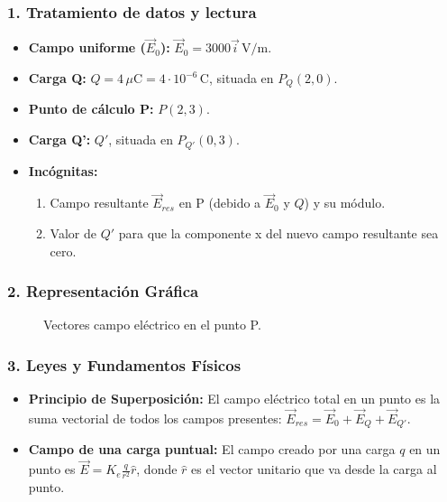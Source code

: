 \subsubsection*{1. Tratamiento de datos y lectura}
\begin{itemize}
    \item \textbf{Campo uniforme ($\vec{E}_0$):} $\vec{E}_0 = 3000\vec{i}\,\text{V/m}$.
    \item \textbf{Carga Q:} $Q = 4\,\mu\text{C} = 4\cdot 10^{-6}\,\text{C}$, situada en $P_Q(2,0)$.
    \item \textbf{Punto de cálculo P:} $P(2,3)$.
    \item \textbf{Carga Q':} $Q'$, situada en $P_{Q'}(0,3)$.
    \item \textbf{Incógnitas:}
    \begin{enumerate}
        \item Campo resultante $\vec{E}_{res}$ en P (debido a $\vec{E}_0$ y $Q$) y su módulo.
        \item Valor de $Q'$ para que la componente x del nuevo campo resultante sea cero.
    \end{enumerate}
\end{itemize}

\subsubsection*{2. Representación Gráfica}
\begin{figure}[H]
    \centering
    \caption{Vectores campo eléctrico en el punto P.}
\end{figure}

\subsubsection*{3. Leyes y Fundamentos Físicos}
\begin{itemize}
    \item \textbf{Principio de Superposición:} El campo eléctrico total en un punto es la suma vectorial de todos los campos presentes: $\vec{E}_{res} = \vec{E}_0 + \vec{E}_Q + \vec{E}_{Q'}$.
    \item \textbf{Campo de una carga puntual:} El campo creado por una carga $q$ en un punto es $\vec{E} = K_e \frac{q}{r^2}\hat{r}$, donde $\hat{r}$ es el vector unitario que va desde la carga al punto.
\end{itemize}

